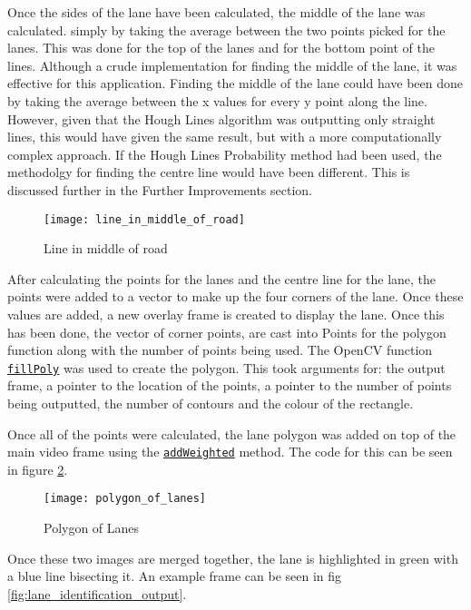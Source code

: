 \documentclass[conference]{IEEEtran}
\begin{document}
Once the sides of the lane have been calculated, the middle of the lane was calculated. simply by taking the average between the two points picked for the lanes. This was done for the top of the lanes and for the bottom point of the lines. Although a crude implementation for finding the middle of the lane, it was effective for this application. Finding the middle of the lane could have been done by taking the average between the x values for every y point along the line. However, given that the Hough Lines algorithm was outputting only straight lines, this would have given the same result, but with a more computationally complex approach. If the Hough Lines Probability method had been used, the methodolgy for finding the centre line would have been different. This is discussed further in the Further Improvements section. 

\begin{figure}[H]
\centerline{\texttt{[image: line\_in\_middle\_of\_road]}}
\caption{Line in middle of road}
\label{fig:line_in_middle_of_road}
\end{figure}

After calculating the points for the lanes and the centre line for the lane, the points were added to a vector to make up the four corners of the lane. Once these values are added, a new overlay frame is created to display the lane. Once this has been done, the vector of corner points, are cast into Points for the polygon function along with the number of points being used. The OpenCV function \href{https://docs.opencv.org/4.x/d6/d6e/group__imgproc__draw.html#ga311160e71d37e3b795324d097cb3a7dc}{\texttt{fillPoly}} was used to create the polygon. This took arguments for: the output frame, a pointer to the location of the points, a pointer to the number of points being outputted, the number of contours and the colour of the rectangle.

Once all of the points were calculated, the lane polygon was added on top of the main video frame using the \href{https://docs.opencv.org/4.x/d2/de8/group__core__array.html#gafafb2513349db3bcff51f54ee5592a19}{\texttt{addWeighted}} method. The code for this can be seen in figure \ref{fig:polygon_of_lanes}.

\begin{figure}[H]
\centerline{\texttt{[image: polygon\_of\_lanes]}}
\caption{Polygon of Lanes}
\label{fig:polygon_of_lanes}
\end{figure}

Once these two images are merged together, the lane is highlighted in green with a blue line bisecting it. An example frame can be seen in fig \ref{fig:lane_identification_output}.
\end{document}
